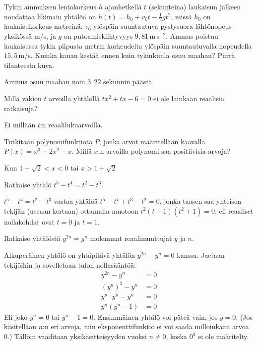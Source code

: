 \begin{multicols}{2}
 \begin{tehtava}
Tykin ammuksen lentokorkeus $h$ ajanhetkellä $t$ (sekunteina) laukaisun jälkeen noudattaa likimain yhtälöä on $h(t)=h_0+v_0t-\frac{1}{2}gt^2$, missä $h_0$ on laukaisukorkeus metreinä, $v_0$ ylöspäin suuntautuva pystysuora lähtönopeus yksikössä m/s, ja $g$ on putoamiskiihtyvyys $9,81$\,m\,s$^{-2}$. Ammus poistuu laukaisussa tykin piipusta metrin korkeudelta ylöspäin suuntautuvalla nopeudella $15,5$\,m/s. Kuinka kauan kestää ennen kuin tykinkuula osuu maahan? Piirrä tilanteesta kuva.
	\begin{vastaus}
	Ammus osuu maahan noin $3,22$ sekunnin päästä. %
	\end{vastaus}
\end{tehtava}

\begin{tehtava}
Millä vakion $t$ arvoilla yhtälöllä $tx^2+tx-6=0$ ei ole lainkaan reaalisia ratkaisuja?
	\begin{vastaus}
Ei millään $t$:n reaalilukuarvoilla.
	\end{vastaus}
\end{tehtava}

\begin{tehtava}
Tutkitaan polynomifunktiota $P$, jonka arvot määritellään kaavalla $P(x)=x^3-2x^2-x$. Millä $x$:n arvoilla polynomi saa positiivisia arvoja?
	\begin{vastaus}
	Kun $1-\sqrt{2}<x<0$ tai $x>1+\sqrt{2}$
	\end{vastaus}
\end{tehtava}

\begin{tehtava}
Ratkaise yhtälö $t^5-t^4=t^2-t^3$.
	\begin{vastaus}
$t^5-t^4=t^2-t^3$ vastaa yhtälöä $t^5-t^4+t^3-t^2=0$, jonka taasen saa yhteisen tekijän (useaan kertaan) ottamalla muotoon $t^2(t-1)(t^2+1)=0$, eli reaaliset nollakohdat ovat $t=0$ ja $t=1$.
	\end{vastaus}
\end{tehtava}

\begin{tehtava}
Ratkaise yhtälöstä $y^{2n}=y^n$ molemmat reaalimuuttujat $y$ ja $n$.
	\begin{vastaus}
Alkuperäinen yhtälö on yhtäpitävä yhtälön $y^{2n}-y^n=0$ kanssa. Jaetaan tekijöihin ja sovelletaan tulon nollasääntöä:
	\begin{align*}
	y^{2n}-y^n&=0 \\
	(y^n)^2-y^n&=0 \\
	y^n \cdot y^n-y^n&=0 \\
	y^n(y^n-1)&=0
	\end{align*}
Eli joko $y^n=0$ tai $y^n-1=0$.	 Ensimmäinen yhtälö voi päteä vain, jos $y=0$. (Jos käsitellään $n$:n eri arvoja, niin eksponenttifunktio ei voi saada milloinkaan arvoa $0$.) Tällöin vaaditaan yksikäsitteisyyden vuoksi $n\neq0$, koska $0^0$ ei ole määritelty.


\end{vastaus}
\end{tehtava}
\end{multicols}
